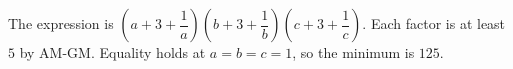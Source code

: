 The expression is $\left(a+3+\dfrac{1}{a}\right)\left(b+3+\dfrac{1}{b}\right)\left(c+3+\dfrac{1}{c}\right)$. Each factor is at least $5$ by AM-GM. Equality holds at $a=b=c=1$, so the minimum is $\boxed{125}$.
